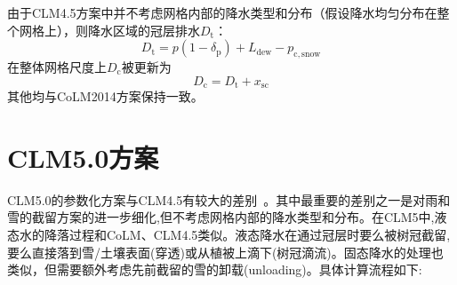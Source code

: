 由于CLM4.5方案中并不考虑网格内部的降水类型和分布（假设降水均匀分布在整个网格上），则降水区域的冠层排水$D_{\mathrm {t}}$：
\begin{equation}
  D_{\mathrm {t}}=p\left(1-\delta_{\mathrm{p}}\right)+L_{\mathrm{dew}}-p_{\mathrm{c,snow}}
\end{equation}
在整体网格尺度上$D_{\mathrm {c}} $被更新为
\begin{equation}
  D_{\mathrm {c}} =D_{\mathrm {t}}+x_{\mathrm{s c}}
\end{equation}
其他均与CoLM2014方案保持一致。

\section{CLM5.0方案}
CLM5.0的参数化方案与CLM4.5有较大的差别~\citep{lawrence2019community}。其中最重要的差别之一是对雨和雪的截留方案的进一步细化,但不考虑网格内部的降水类型和分布。在CLM5中,液态水的降落过程和CoLM、CLM4.5类似。液态降水在通过冠层时要么被树冠截留,要么直接落到雪/土壤表面(穿透)或从植被上滴下(树冠滴流)。固态降水的处理也类似，但需要额外考虑先前截留的雪的卸载(unloading)。具体计算流程如下:

